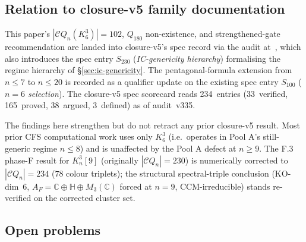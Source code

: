 \documentclass[12pt,a4paper]{article}
\theoremstyle{definition}
\theoremstyle{remark}
\newcommand{\bC}{\mathbb{C}}
\newcommand{\bH}{\mathbb{H}}
\newcommand{\Kn}{K_n^3}
\newcommand{\Qn}{Q_n}
\newcommand{\Ccls}{\mathcal{C}}             %
\begin{document}
\subsection{Relation to closure-v5 family documentation}
\label{sec:disc-closure-v5}

This paper's $|\Ccls\Qn(K_6^3)| = 102$, $Q_{180}$ non-existence, and
strengthened-gate recommendation are landed into closure-v5's spec
record via the audit at~\cite{closure-v5-audit-threebug}, which also
introduces the spec entry $S_{230}$ (\emph{IC-genericity hierarchy})
formalising the regime hierarchy of \S\ref{sec:ic-genericity}. The
pentagonal-formula extension from~$n \le 7$ to $n \le 20$ is recorded
as a qualifier update on the existing spec entry $S_{100}$
(\emph{$n=6$ selection}). The closure-v5 spec scorecard reads
234~entries (33~verified, 165~proved, 38~argued, 3~defined) as of
audit~v335.

The findings here strengthen but do not retract any prior closure-v5
result. Most prior CFS computational work uses only $K_6^3$ (i.e.\
operates in Pool A's still-generic regime $n \le 8$) and is
unaffected by the Pool A defect at $n \ge 9$. The F.3 phase-F result
for $\Kn[9]$ (originally $|\Ccls\Qn| = 230$) is numerically corrected
to $|\Ccls\Qn| = 234$ ($78$ colour triplets); the structural
spectral-triple conclusion (KO-dim~6, $A_F = \bC \oplus \bH \oplus
M_3(\bC)$ forced at $n=9$, CCM-irreducible) stands re-verified on
the corrected cluster set.

\subsection{Open problems}\label{sec:disc-open}
\end{document}
